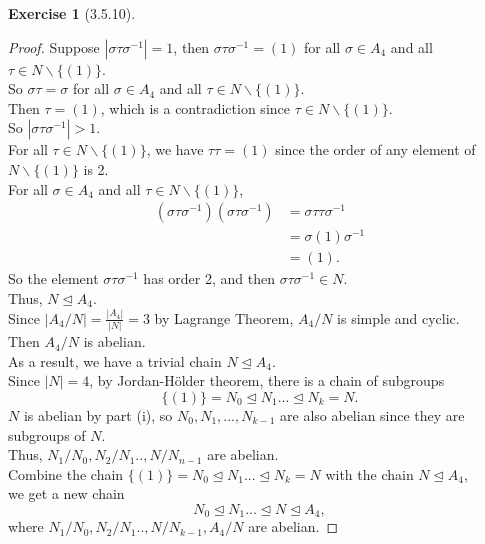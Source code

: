 \documentclass{amsart}
\theoremstyle{plain}
\theoremstyle{definition}
\newtheorem{exer}[lem]{Exercise}
\begin{document}
\begin{exer}[3.5.10]
\begin{enumerate}[(a)]
\begin{proof}
  Suppose $|\sigma\tau\sigma^{-1}| = 1$, then $\sigma\tau\sigma^{-1} = (1)$ for all $\sigma\in A_4$ and all $\tau\in N\smallsetminus\{(1)\}$. \\
  So $\sigma\tau = \sigma$ for all $\sigma\in A_4$ and all $\tau\in N\smallsetminus\{(1)\}$.\\
  Then $\tau = (1)$, which is a contradiction since $\tau \in N\smallsetminus\{(1)\}$.\\
  So $|\sigma\tau\sigma^{-1}| > 1$.\\
  For all $\tau\in N\smallsetminus\{(1)\}$, we have $\tau \tau = (1)$ since the order of any element of $N\smallsetminus\{(1)\}$ is 2.\\
  For all $\sigma\in A_4$ and all $\tau\in N\smallsetminus\{(1)\}$,
  \begin{align*}
  	(\sigma\tau\sigma^{-1})(\sigma\tau\sigma^{-1}) &= \sigma\tau\tau\sigma^{-1} \\
  												   &= \sigma(1)\sigma^{-1} \\
  												   &= (1).
  \end{align*}
  	So the element $\sigma\tau\sigma^{-1}$ has order 2, and then $\sigma\tau\sigma^{-1} \in N$.\\
  	Thus, $N\unlhd A_4$.\\
	Since $|A_4/N| = \frac{|A_4|}{|N|} = 3$ by Lagrange Theorem, $A_4/N$ is simple and cyclic.\\
	Then $A_4/N$ is abelian.\\
	As a result, we have a trivial chain $N \unlhd A_4$.\\
  	Since $|N| = 4$, by Jordan-H\"older theorem, there is a chain of subgroups 
  	\[ \{(1)\} = N_0 \unlhd N_1...\unlhd N_k = N.\] 
  	$N$ is abelian by part (i), so $N_0,N_1, ..., N_{k-1}$ are also abelian since they are subgroups of $N$.\\ 
  	Thus, $N_1/N_0,N_2/N_1..,N/N_{n-1}$ are abelian.\\
	Combine the chain $\{(1)\} = N_0 \unlhd N_1...\unlhd N_k = N$ with the chain $N \unlhd A_4$,\\
	we get a new chain
	\[  N_0 \unlhd N_1...\unlhd  N \unlhd A_4,\]
	where $N_1/N_0, N_2/N_1..,N/N_{k-1}, A_4/N$ are abelian.
 \end{proof}
  	
\end{enumerate}
\end{exer}
\end{document}
